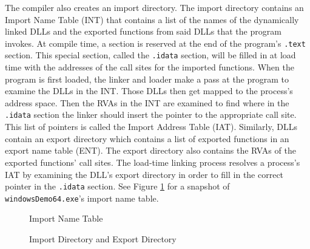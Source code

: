 \documentclass[preprint,12pt]{elsarticle}
\begin{document}
The compiler also creates an import directory. The import directory contains an Import Name Table (INT) that contains a list of the names of the dynamically linked DLLs and the exported functions from said DLLs that the program invokes. At compile time, a section is reserved at the end of the program's \texttt{.text} section. This special section, called the \texttt{.idata} section, will be filled in at load time with the addresses of the call sites for the imported functions. When the program is first loaded, the linker and loader make a pass at the program to examine the DLLs in the INT. Those DLLs then get mapped to the process's address space. Then the RVAs in the INT are examined to find where in the \texttt{.idata} section the linker should insert the pointer to the appropriate call site. This list of pointers is called the Import Address Table (IAT). Similarly, DLLs contain an export directory which contains a list of exported functions in an export name table (ENT). The export directory also contains the RVAs of the exported functions' call sites. The load-time linking process resolves a process's IAT by examining the DLL's export directory in order to fill in the correct pointer in the \texttt{.idata} section. See Figure \ref{fig:int} for a snapshot of \texttt{windowsDemo64.exe}'s import name table.

\begin{figure}[ht]
\caption{Import Name Table}
\label{fig:int}
\end{figure}

\begin{figure}[ht]
\caption{Import Directory and Export Directory}
\label{fig:import_export}
\end{figure}
\end{document}
